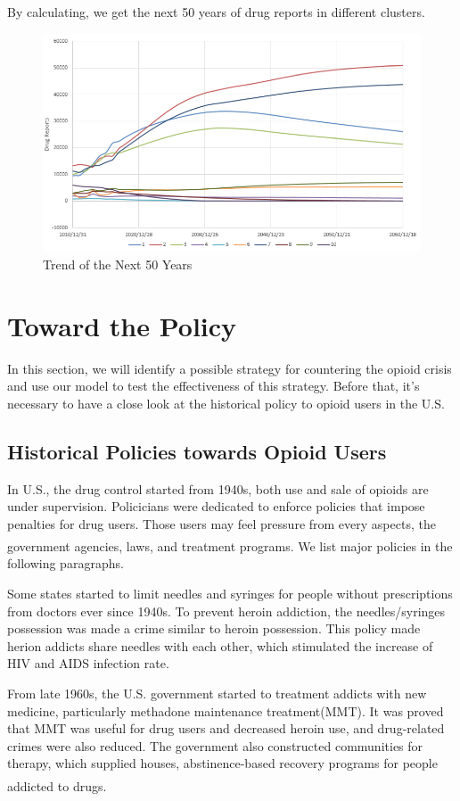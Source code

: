 \documentclass[12pt]{article}
\newcommand{\upcite}[1]{\textsuperscript{\textsuperscript{\cite{#1}}}}
\begin{document}
By calculating, we get the next 50 years of drug reports in different clusters. 
\begin{figure}[H]
	\centering
	\includegraphics[scale=0.8]{./figures/12.png}
	\caption{Trend of the Next 50 Years}
	\label{Fig12}
\end{figure}

\section{Toward the Policy}
In this section, we will identify a possible strategy for countering the opioid crisis and use our model to test the effectiveness of this strategy. Before that, it’s necessary to have a close look at the historical policy to opioid users in the U.S.

\subsection{Historical Policies towards Opioid Users} %
In U.S., the drug control started from 1940s, both use and sale of opioids are under supervision. Policicians were dedicated to enforce policies that impose penalties for drug users. Those users may feel pressure from every aspects, the government agencies, laws, and treatment programs\upcite{5}. We list major policies in the following paragraphs.

Some states started to limit needles and syringes for people without prescriptions from doctors ever since 1940s. To prevent heroin addiction, the needles/syringes possession was made a crime similar to heroin possession. This policy made herion addicts share needles with each other, which stimulated the increase of HIV and AIDS infection rate.

From late 1960s, the U.S. government started to treatment addicts with new medicine, particularly methadone maintenance treatment(MMT). It was proved that MMT was useful for drug users and decreased heroin use, and drug-related crimes were also reduced. The government also constructed communities for therapy, which supplied houses, abstinence-based recovery programs for people addicted to drugs\upcite{4}.
\end{document}
